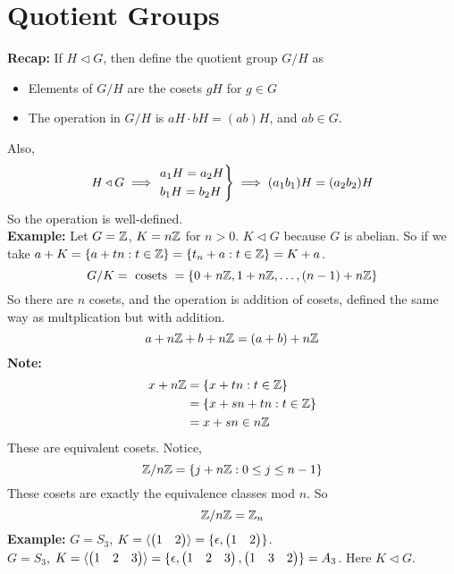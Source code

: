 \documentclass[openany]{report}
\begin{document}
\chapter{Quotient Groups}
\textbf{Recap:} If $H \triangleleft G$, then define the quotient group $G/H$ as 
\begin{itemize}
    \item Elements of $G/H$ are the cosets $gH$ for $g \in G$
    \item The operation in $G/H$ is $aH \cdot bH = (ab)H$, and $ab \in G$.
\end{itemize}
Also, 
\[H \triangleleft G \implies \begin{rcases}
    a_1H = a_2H \\
    b_1H = b_2H
\end{rcases} \implies (a_1b_1)H = (a_2b_2)H\]
So the operation is well-defined.\\[3ex]
\noindent
\textbf{Example:}
Let $G = \mathbb{Z}$, $K = n\mathbb{Z}$ for $n > 0$. $K \triangleleft G$ because $G$ is abelian. So if we take $a + K = \{a + tn : t \in \mathbb{Z}\} = \{t_n + a: t \in \mathbb{Z}\} =K + a$.
\[G/ K = \text{ cosets } = \left\{0 + n\mathbb{Z}, 1 + n\mathbb{Z}, \ldots,(n-1) + n\mathbb{Z} \right\}\]
So there are $n$ cosets, and the operation is addition of cosets, defined the same way as multplication but with addition. 
\[a + n\mathbb{Z} + b + n\mathbb{Z} = (a+b)+ n\mathbb{Z}\]
\textbf{Note:} 
\begin{align*}
    x + n\mathbb{Z} &= \{x + tn: t \in \mathbb{Z}\}\\
    &= \{x + sn + tn : t \in \mathbb{Z}\}\\
    &= x + sn \in n\mathbb{Z}\
\end{align*}
These are equivalent cosets. Notice, 
\[\mathbb{Z}/n\mathbb{Z} = \{j + n\mathbb{Z} : 0 \leq j \leq n-1\}\]
These cosets are exactly the equivalence classes mod $n$. So
\[\mathbb{Z}/n\mathbb{Z} = \mathbb{Z}_n\]
\textbf{Example:}
$G = S_3$, $K = \langle \begin{pmatrix}1 & 2\end{pmatrix} \rangle = \{\epsilon, \begin{pmatrix}1 & 2\end{pmatrix}\}$.\\[2ex]
$G = S_3$, $K = \langle \begin{pmatrix}1 & 2 & 3\end{pmatrix} \rangle = \{\epsilon, \begin{pmatrix}1 & 2 & 3\end{pmatrix}, \begin{pmatrix}1 & 3 & 2\end{pmatrix}\} = A_3$. Here $K \triangleleft G$. 
\end{document}
